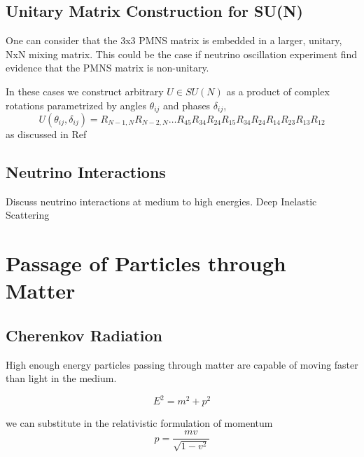 \documentclass[main.tex]{subfiles}
\begin{document}
\subsection{Unitary Matrix Construction for SU(N)}

One can consider that the 3x3 PMNS matrix is embedded in a larger, unitary, NxN mixing matrix.
This could be the case if neutrino oscillation experiment find evidence that the PMNS matrix is non-unitary.

In these cases we construct arbitrary $U\in SU(N)$ as a product of complex rotations parametrized by angles $\theta_{ij}$ and phases $\delta_{ij}$, 
\begin{equation}
    U(\theta_{ij}, \delta_{ij}) = R_{N-1,N}R_{N-2,N}\ldots R_{45}R_{34}R_{24}R_{15}R_{34}R_{24}R_{14}R_{23}R_{13}R_{12}
\end{equation}
as discussed in Ref~\cite{Arguelles:2020hss}

\subsection{Neutrino Interactions}
Discuss neutrino interactions at medium to high energies. Deep Inelastic Scattering


\section{Passage of Particles through Matter}

\subsection{Cherenkov Radiation}

High enough energy particles passing through matter are capable of moving faster than light in the medium. 

\begin{equation}
    E^{2} = m^{2} + p^{2}
\end{equation}

we can substitute in the relativistic formulation of momentum
\begin{equation}
    p = \dfrac{mv}{\sqrt{1-v^{2}}}
\end{equation}
\end{document}
